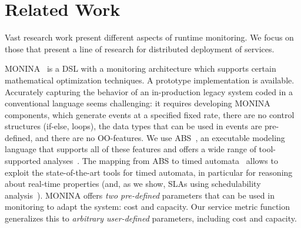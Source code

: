 

\section{Related Work}
\label{sec:relatedwork}

Vast research work present different aspects of runtime monitoring.
We focus on those that present a line of research for distributed deployment of services.

MONINA~\cite{inzinger:monitoring} is a DSL with a monitoring architecture
which supports certain mathematical optimization techniques.
A prototype implementation is available.
Accurately capturing the
behavior of an in-production legacy system coded in a
conventional language seems challenging: it requires
developing MONINA components, which
generate events at a specified fixed rate,  there are no control structures (if-else, loops), the data types that can be used in events are pre-defined, and there are no OO-features. 
We use ABS~\cite{johnsen2012abs}, an executable modeling language
that supports all of these features and offers a wide range of tool-supported analyses~\cite{BubelMH14,WongBBGGHMS15}.  The mapping from ABS to timed automata~\cite{alur:1994:timedautomata} allows to
exploit the state-of-the-art tools for timed automata, in
particular for reasoning about real-time properties (and, as we show, SLAs using
schedulability analysis~\cite{fersman2007task}).
MONINA offers \emph{two pre-defined} parameters that can be used in monitoring to adapt
the system: cost and capacity.  Our service metric function generalizes this to
\emph{arbitrary user-defined} parameters, including cost and capacity.

